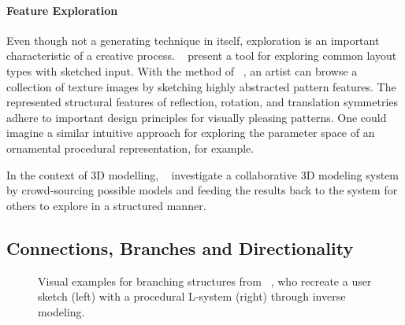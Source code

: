 \paragraph*{Feature Exploration}
\label{para:analysis_rulebased_exploration}

Even though not a generating technique in itself, exploration is an important characteristic of a creative process. \citeauthor*{todi_2016_sse}~\cite{todi_2016_sse} present a tool for exploring common layout types with sketched input. With the method of \citeauthor*{chen_2016_msi}~\cite{chen_2016_msi}, an artist can browse a collection of texture images by sketching highly abstracted pattern features. The represented structural features of reflection, rotation, and translation symmetries adhere to important design principles for visually pleasing patterns. One could imagine a similar intuitive approach for exploring the parameter space of an ornamental procedural representation, for example.

In the context of 3D modelling, \citeauthor*{talton_2009_emw}~\cite{talton_2009_emw} investigate a collaborative 3D modeling system by crowd-sourcing possible models and feeding the results back to the system for others to explore in a structured manner. 

\subsection{Connections, Branches and Directionality}
\label{subsec:analysis_connections_branches_and_directionality}

  

\begin{figure}[H]
    \centering
    \caption{\label{fig:guo_2020_ipm} Visual examples for branching structures from \citeauthor*{guo_2020_ipm}~\cite{guo_2020_ipm}, who recreate a user sketch (left) with a procedural L-system (right) through inverse modeling.}
\end{figure}

